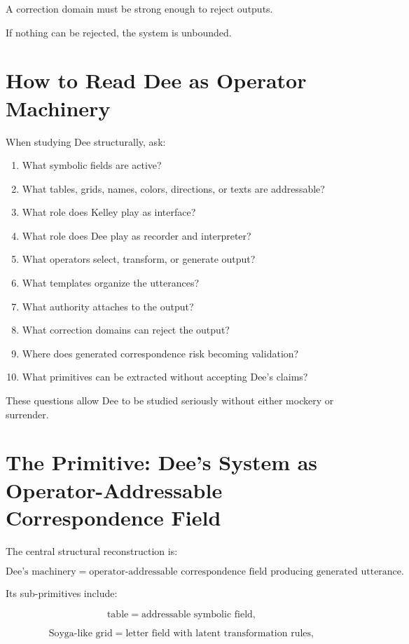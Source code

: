 \documentclass[11pt]{book}
\begin{document}
A correction domain must be strong enough to reject outputs.

If nothing can be rejected, the system is unbounded.

\section{How to Read Dee as Operator Machinery}

When studying Dee structurally, ask:

\begin{enumerate}[label=\arabic*.]
    \item What symbolic fields are active?
    \item What tables, grids, names, colors, directions, or texts are addressable?
    \item What role does Kelley play as interface?
    \item What role does Dee play as recorder and interpreter?
    \item What operators select, transform, or generate output?
    \item What templates organize the utterances?
    \item What authority attaches to the output?
    \item What correction domains can reject the output?
    \item Where does generated correspondence risk becoming validation?
    \item What primitives can be extracted without accepting Dee's claims?
\end{enumerate}

These questions allow Dee to be studied seriously without either mockery or surrender.

\section{The Primitive: Dee's System as Operator-Addressable Correspondence Field}

The central structural reconstruction is:

\[
\text{Dee's machinery}
=
\text{operator-addressable correspondence field producing generated utterance}.
\]

Its sub-primitives include:

\[
\text{table} = \text{addressable symbolic field},
\]

\[
\text{Soyga-like grid} = \text{letter field with latent transformation rules},
\]
\end{document}

